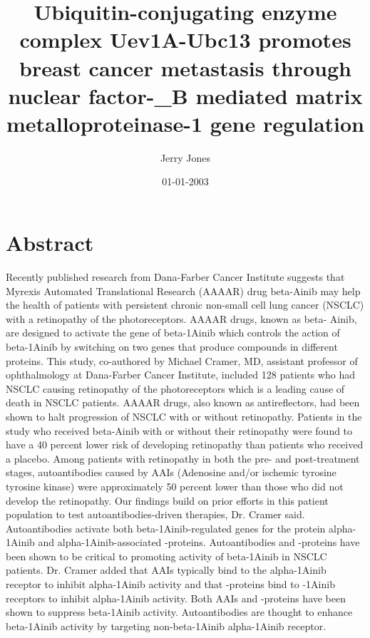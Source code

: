 \documentclass{article}%
\title{Ubiquitin{-}conjugating enzyme complex Uev1A{-}Ubc13 promotes breast cancer metastasis through nuclear factor{-}\_B mediated matrix metalloproteinase{-}1 gene regulation}%
\author{Jerry Jones}%
\affil{Department of Pathology, Microbiology and Immunology, School of Medicine, University of South Carolina, Columbia, South Carolina, United States of America}%
\date{01{-}01{-}2003}%
\begin{document}
%
\normalsize%
\maketitle%
\section{Abstract}%
\label{sec:Abstract}%
Recently published research from Dana{-}Farber Cancer Institute suggests that Myrexis Automated Translational Research (AAAAR) drug beta{-}Ainib may help the health of patients with persistent chronic non{-}small cell lung cancer (NSCLC) with a retinopathy of the photoreceptors. AAAAR drugs, known as beta{-} Ainib, are designed to activate the gene of beta{-}1Ainib which controls the action of beta{-}1Ainib by switching on two genes that produce compounds in different proteins.\newline%
This study, co{-}authored by Michael Cramer, MD, assistant professor of ophthalmology at Dana{-}Farber Cancer Institute, included 128 patients who had NSCLC causing retinopathy of the photoreceptors which is a leading cause of death in NSCLC patients. AAAAR drugs, also known as antireflectors, had been shown to halt progression of NSCLC with or without retinopathy. Patients in the study who received beta{-}Ainib with or without their retinopathy were found to have a 40 percent lower risk of developing retinopathy than patients who received a placebo. Among patients with retinopathy in both the pre{-} and post{-}treatment stages, autoantibodies caused by AAIs (Adenosine and/or ischemic tyrosine tyrosine kinase) were approximately 50 percent lower than those who did not develop the retinopathy.\newline%
Our findings build on prior efforts in this patient population to test autoantibodies{-}driven therapies, Dr. Cramer said. Autoantibodies activate both beta{-}1Ainib{-}regulated genes for the protein alpha{-}1Ainib and alpha{-}1Ainib{-}associated {-}proteins. Autoantibodies and {-}proteins have been shown to be critical to promoting activity of beta{-}1Ainib in NSCLC patients. Dr. Cramer added that AAIs typically bind to the alpha{-}1Ainib receptor to inhibit alpha{-}1Ainib activity and that {-}proteins bind to {-}1Ainib receptors to inhibit alpha{-}1Ainib activity.\newline%
Both AAIs and {-}proteins have been shown to suppress beta{-}1Ainib activity. Autoantibodies are thought to enhance beta{-}1Ainib activity by targeting non{-}beta{-}1Ainib alpha{-}1Ainib receptor.\newline%
\end{document}
